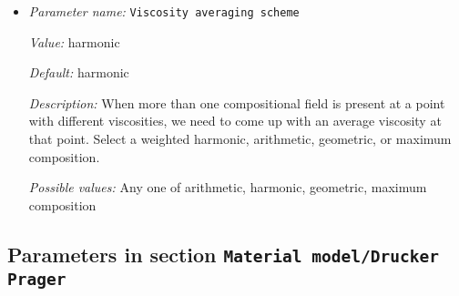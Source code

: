 \begin{itemize}
{\it Description:} List of thermal expansivities for background mantle and compositional fields, for a total of N+1 values, where N is the number of compositional fields. If only one value is given, then all use the same value.  Units: $1 / K$


{\it Possible values:} A list of 0 to 4294967295 elements where each element is [A floating point number $v$ such that $0 \leq v \leq \text{MAX\_DOUBLE}$]
\item {\it Parameter name:} {\tt Viscosity averaging scheme}
\label{parameters:Material model/Diffusion dislocation/Viscosity averaging scheme}


{\it Value:} harmonic


{\it Default:} harmonic


{\it Description:} When more than one compositional field is present at a point with different viscosities, we need to come up with an average viscosity at that point.  Select a weighted harmonic, arithmetic, geometric, or maximum composition.


{\it Possible values:} Any one of arithmetic, harmonic, geometric, maximum composition
\end{itemize}

\subsection{Parameters in section \tt Material model/Drucker Prager}
\label{parameters:Material_20model/Drucker_20Prager}

